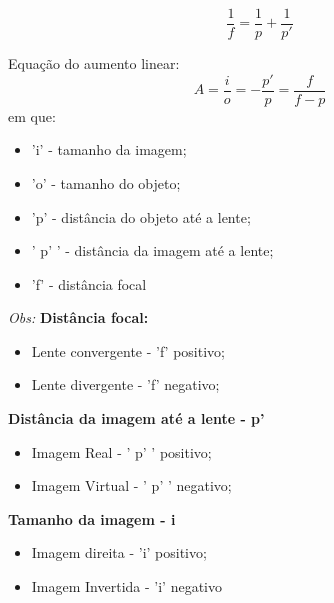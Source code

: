 \documentclass[12pt]{extarticle}
\newcommand{\<}{\langle}
\renewcommand{\>}{\rangle}
\theoremstyle{definition}
\begin{document}
\begin{equation}
    \frac{1}{f} = \frac{1}{p} + \frac{1}{p'}
\end{equation}

Equação do aumento linear:
\begin{equation}
    A = \frac{i}{o} = -\frac{p'}{p} = \frac{f}{f-p}
\end{equation}
\noindent em que:
\begin{itemize}
    \item 'i' - tamanho da imagem;
    \item 'o' - tamanho do objeto;
    \item 'p' - distância do objeto até a lente;
    \item ' p' ' - distância da imagem até a lente;
    \item 'f' - distância focal
\end{itemize}
\textit{Obs:}
\textbf{Distância focal:}
\begin{itemize}
    \item Lente convergente - 'f' positivo;
    \item Lente divergente - 'f' negativo;
\end{itemize}
\textbf{Distância da imagem até a lente - p'}
\begin{itemize}
    \item Imagem Real - ' p' ' positivo;
    \item Imagem Virtual - ' p' ' negativo;
\end{itemize}
\textbf{Tamanho da imagem - i}
\begin{itemize}
    \item Imagem direita - 'i' positivo;
    \item Imagem Invertida - 'i' negativo
\end{itemize}
\end{document}
